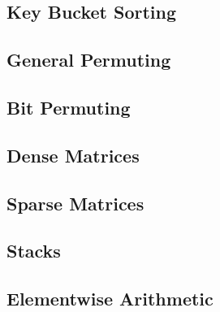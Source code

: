 \tobewritten


\subsection{Key Bucket Sorting}
\label{sec:ref-imp-ami-kb-sort}

\tobewritten


\subsection{General Permuting}
\label{sec:ref-imp-ami-gp}

\tobewritten


\subsection{Bit Permuting}
\label{sec:ref-imp-ami-bp}

\tobewritten


\subsection{Dense Matrices}
\label{sec:ref-imp-ami-matrix}

\tobewritten


\subsection{Sparse Matrices}
\label{sec:ref-imp-ami-sm}

\tobewritten


\subsection{Stacks}
\label{sec:ref-imp-ami-stack}

\tobewritten


\subsection{Elementwise Arithmetic}
\label{sec:ref-imp-ami-arith}

\tobewritten


